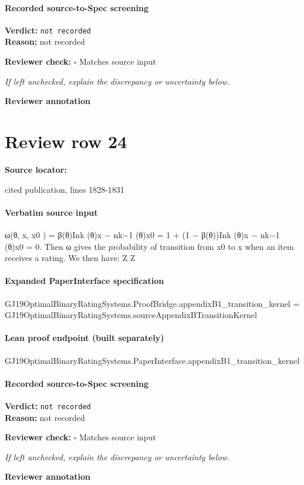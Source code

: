 \documentclass[10pt]{article}
\newcommand{\reviewerbox}{%
  \par\noindent\fbox{\parbox{0.96\linewidth}{\rule{0pt}{0.38in}}}\par
}
\newcommand{\reviewmatch}[1]{%
  \par\noindent\textbf{Reviewer check:} $\square$\; #1\par
  \noindent\emph{If left unchecked, explain the discrepancy or uncertainty below.}\par
}
\begin{document}
\paragraph{Recorded source-to-Spec screening}
\textbf{Verdict:} \texttt{not recorded}
\\
\textbf{Reason:} not recorded
\reviewmatch{Matches source input}
\noindent\textbf{Reviewer annotation}\par
\reviewerbox
\clearpage
\hypertarget{source-claim-9053ffafcfb8db42}{}
\section*{Review row 24}
\textbf{Source locator:} {\footnotesize\raggedright cited publication, lines 1828-\allowbreak{}1831\par}
\paragraph{Verbatim source input}
\begin{ReviewVerbatim}
ω(θ, x, x0 ) = β(θ)I{nk (θ)x − nk−1 (θ)x0 = 1} + (1 − β(θ))I{nk (θ)x − nk−1 (θ)x0 = 0}.
Then ω gives the probability of transition from x0 to x when an item receives a rating. We then
have:
Z Z
\end{ReviewVerbatim}


\paragraph{Expanded PaperInterface specification}
\begin{ReviewVerbatim}
GJ19OptimalBinaryRatingSystems.ProofBridge.appendixB1_transition_kernel =
  GJ19OptimalBinaryRatingSystems.sourceAppendixBTransitionKernel
\end{ReviewVerbatim}

\paragraph{Lean proof endpoint (built separately)}\begin{ReviewVerbatim}
GJ19OptimalBinaryRatingSystems.PaperInterface.appendixB1_transition_kernel
\end{ReviewVerbatim}

\paragraph{Recorded source-to-Spec screening}
\textbf{Verdict:} \texttt{not recorded}
\\
\textbf{Reason:} not recorded
\reviewmatch{Matches source input}
\noindent\textbf{Reviewer annotation}\par
\reviewerbox
\clearpage
\hypertarget{source-claim-6724e8b8f279b968}{}
\end{document}
